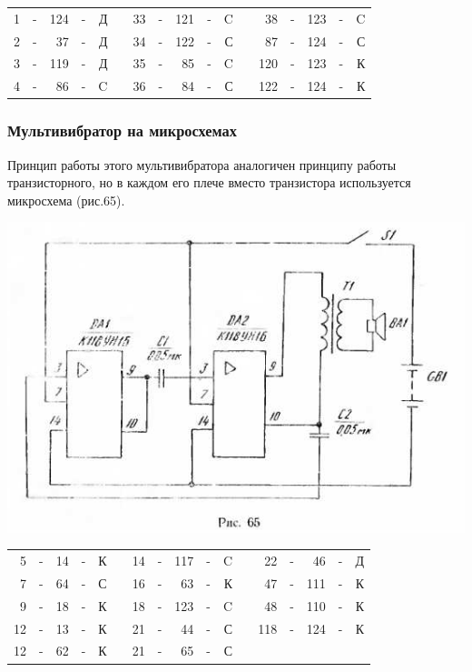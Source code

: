 \documentclass[12pt]{article}
\begin{document}
\hrulefill

\begin{tabular}{r c r c r p{2cm} r c r c r p{2cm} r c r c r}
 1 & - & 124 & - & Д &     & 33 & - & 121 & - & C &    &  38 & - & 123  & - & C\\
 2 & - &  37 & - & Д &     & 34 & - & 122 & - & С &    &  87 & - & 124  & - & С\\
 3 & - & 119 & - & Д &     & 35 & - &  85 & - & C &    & 120 & - & 123  & - & К\\
 4 & - &  86 & - & C &     & 36 & - &  84 & - & С &    & 122 & - & 124  & - & К\\
\end{tabular}

\hrulefill

\newpage

\subsubsection{Мультивибратор на микросхемах}

Принцип работы этого мультивибратора аналогичен принципу работы транзисторного, но в каждом его плече вместо транзистора используется микросхема (рис.65).

\includegraphics[scale=1, angle=0]{ekon3_065_1}

\hrulefill

\begin{tabular}{r c r c r p{2cm} r c r c r p{2cm} r c r c r}
 5 & - &  14 & - & К &     & 14 & - & 117 & - & C &    &  22 & - &  46  & - & Д\\
 7 & - &  64 & - & С &     & 16 & - &  63 & - & К &    &  47 & - & 111  & - & К\\
 9 & - &  18 & - & К &     & 18 & - & 123 & - & C &    &  48 & - & 110  & - & К\\
12 & - &  13 & - & К &     & 21 & - &  44 & - & С &    & 118 & - & 124  & - & К\\
12 & - &  62 & - & К &     & 21 & - &  65 & - & С &    &     &   &      &   &  \\
\end{tabular}
\end{document}
